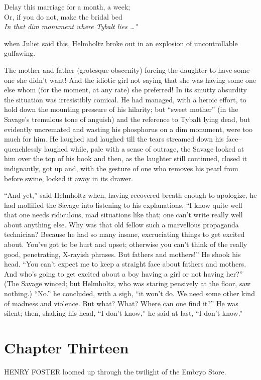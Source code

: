 \documentclass[12pt]{report}
\newcommand{\mychapter}[2]{
\setcounter{chapter}{#1}
    \setcounter{section}{0}
    \chapter*{#2}
    \addcontentsline{toc}{chapter}{#2}
}
\begin{document}
Delay this marriage for a month, a week;\\

Or, if you do not, make the bridal bed\\

\emph{In that dim monument where Tybalt lies \ldots{}"\\
}

when Juliet said this, Helmholtz broke out in an explosion of
uncontrollable guffawing.

The mother and father (grotesque obscenity) forcing the daughter to have
some one she didn't want! And the idiotic girl not saying that she was
having some one else whom (for the moment, at any rate) she preferred!
In its smutty absurdity the situation was irresistibly comical. He had
managed, with a heroic effort, to hold down the mounting pressure of his
hilarity; but ``sweet mother'' (in the Savage's tremulous tone of
anguish) and the reference to Tybalt lying dead, but evidently
uncremated and wasting his phosphorus on a dim monument, were too much
for him. He laughed and laughed till the tears streamed down his
face--quenchlessly laughed while, pale with a sense of outrage, the
Savage looked at him over the top of his book and then, as the laughter
still continued, closed it indignantly, got up and, with the gesture of
one who removes his pearl from before swine, locked it away in its
drawer.

``And yet,'' said Helmholtz when, having recovered breath enough to
apologize, he had mollified the Savage into listening to his
explanations, ``I know quite well that one needs ridiculous, mad
situations like that; one can't write really well about anything else.
Why was that old fellow such a marvellous propaganda technician? Because
he had so many insane, excruciating things to get excited about. You've
got to be hurt and upset; otherwise you can't think of the really good,
penetrating, X-rayish phrases. But fathers and mothers!'' He shook his
head. ``You can't expect me to keep a straight face about fathers and
mothers. And who's going to get excited about a boy having a girl or not
having her?'' (The Savage winced; but Helmholtz, who was staring
pensively at the floor, saw nothing.) ``No.'' he concluded, with a sigh,
``it won't do. We need some other kind of madness and violence. But
what? What? Where can one find it?'' He was silent; then, shaking his
head, ``I don't know,'' he said at last, ``I don't know.''

\mychapter{13}{Chapter Thirteen}
HENRY FOSTER loomed up through the twilight of the Embryo Store.
\end{document}
